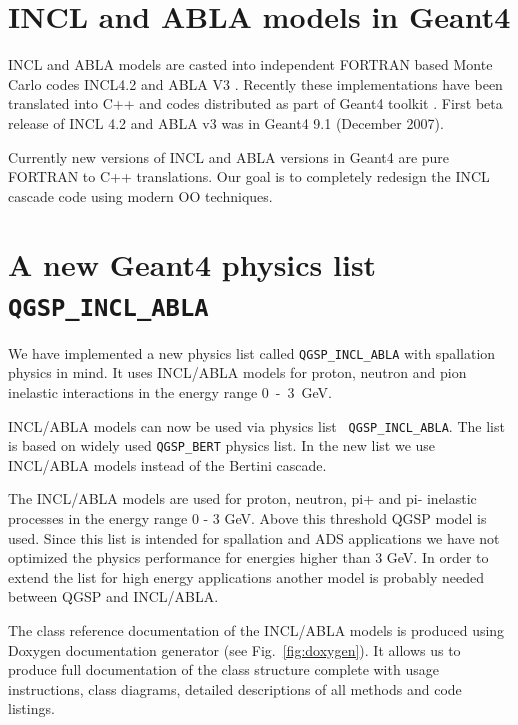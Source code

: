 \documentclass[a4paper]{jpconf}
\begin{document}
\section{INCL and ABLA models in Geant4} \label{sec:models}

INCL and ABLA models are casted into independent FORTRAN based Monte Carlo codes 
INCL4.2 and ABLA V3 \cite{heikkinen07mProceedings}.
Recently these implementations have been translated into C++ and codes distributed
as part of Geant4 toolkit \cite{heikkinen03aPaper}. 
First beta release of INCL 4.2 and ABLA v3 was in Geant4  9.1 (December 2007).

Currently new versions of INCL and ABLA versions in Geant4 are pure
FORTRAN to C++ translations. Our goal is to completely redesign the
INCL cascade code using modern OO techniques.

\section{A new Geant4 physics list {\tt QGSP\_\-INCL\_ABLA}}\label{sec:newlist}

We have implemented a new physics list called {\tt QGSP\_\-INCL\_ABLA} with
spallation physics in mind. 
It uses INCL/ABLA models for proton,
neutron and pion inelastic interactions in the energy range 0~-~3~GeV.

INCL/ABLA models can now be used via physics list {\tt
QGSP\_INCL\_ABLA}. The list is based on widely used {\tt QGSP\_BERT}
physics list. In the new list we use INCL/ABLA models instead of the
Bertini cascade.

The INCL/ABLA models are used for proton, neutron, pi+ and pi-
inelastic processes in the energy range 0 - 3 GeV. Above this
threshold QGSP model is used. Since this list is intended for
spallation and ADS applications we have not optimized the physics
performance for energies higher than 3 GeV. In order to extend the
list for high energy applications another model is probably needed
between QGSP and INCL/ABLA.

The class reference documentation of the INCL/ABLA models is produced
using Doxygen \cite{doxygen} documentation generator (see Fig.~\ref{fig:doxygen}). It allows us to
produce full documentation of the class structure complete with usage
instructions, class diagrams, detailed descriptions of all methods and
code listings.
\end{document}
